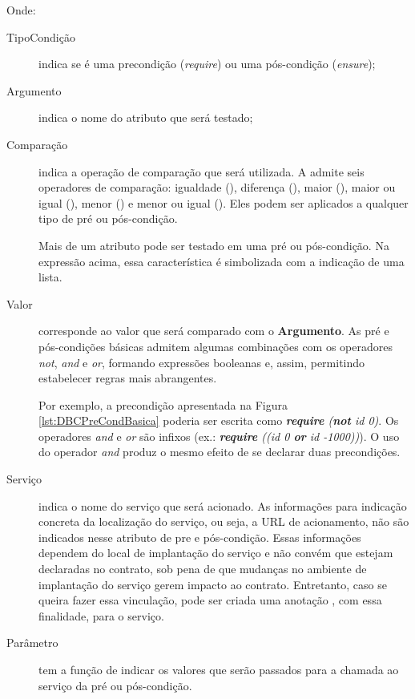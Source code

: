 Onde:
\vspace{-6mm}
\begin{description}
\item [TipoCondição] indica se é uma precondição (\emph{require}) ou uma
pós-condição (\emph{ensure});

\item [Argumento] indica o nome do atributo que será testado;

\item [Comparação] indica a operação de comparação que será utilizada. A
\neoidl{}  admite seis operadores de comparação: igualdade (\literal{==}), 
diferença (\literal{<>}), maior (\literal{>}), maior ou igual (\literal{>=}), 
menor (\literal{<}) e menor ou igual (\literal{<=}). Eles podem ser aplicados  a
qualquer tipo de pré ou pós-condição.

Mais de um atributo pode ser testado em uma pré ou pós-condição. Na expressão
acima, essa característica é simbolizada com a indicação de uma lista.

\item [Valor] corresponde ao valor que será comparado com o \textbf{Argumento}.
As pré e pós-condições básicas admitem algumas combinações com os operadores
\emph{not}, \emph{and} e \emph{or}, formando expressões booleanas e,
assim, permitindo estabelecer regras mais abrangentes.

Por exemplo, a precondição apresentada na Figura \ref{lst:DBCPreCondBasica} poderia
ser escrita como \emph{\textbf{require} (\textbf{not} id \literal{<=} 0)}. Os
operadores \emph{and} e \emph{or} são infixos (ex.: \emph{\textbf{require}
((id \literal{>} 0 \textbf{or} id \literal{<=} -1000))}). O uso do operador
\emph{and} produz o mesmo efeito de se declarar duas precondições.

\item [Serviço] indica o nome do serviço que será acionado. As informações para
indicação concreta da localização do serviço, ou seja, a URL de acionamento, não
são indicados nesse atributo de pre e pós-condição. Essas informações dependem
do local de implantação do serviço e não convém que estejam declaradas no
contrato, sob pena de que mudanças no ambiente de implantação do serviço gerem
impacto ao contrato.
Entretanto, caso se queira fazer essa vinculação, pode ser criada uma anotação
\neoidl{}, com essa finalidade, para o serviço.

\item [Parâmetro] tem a função de indicar os valores que serão passados para a
chamada ao serviço da pré ou pós-condição.


\end{description}

